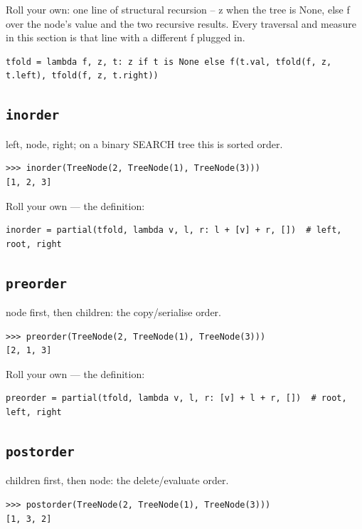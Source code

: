 \documentclass[10pt,letterpaper]{book}
\begin{document}
Roll your own: one line of structural recursion -- z when the tree is None, else f over the node's value and the two recursive results. Every traversal and measure in this section is that line with a different f plugged in.

\begin{lstlisting}[style=ex]
tfold = lambda f, z, t: z if t is None else f(t.val, tfold(f, z, t.left), tfold(f, z, t.right))
\end{lstlisting}

\subsection{\texttt{inorder}}\label{def:inorder}
left, node, right; on a binary SEARCH tree this is sorted order.
\begin{lstlisting}[style=ex]
>>> inorder(TreeNode(2, TreeNode(1), TreeNode(3)))
[1, 2, 3]
\end{lstlisting}

Roll your own --- the definition:

\begin{lstlisting}[style=ex]
inorder = partial(tfold, lambda v, l, r: l + [v] + r, [])  # left, root, right
\end{lstlisting}

\subsection{\texttt{preorder}}\label{def:preorder}
node first, then children: the copy/serialise order.
\begin{lstlisting}[style=ex]
>>> preorder(TreeNode(2, TreeNode(1), TreeNode(3)))
[2, 1, 3]
\end{lstlisting}

Roll your own --- the definition:

\begin{lstlisting}[style=ex]
preorder = partial(tfold, lambda v, l, r: [v] + l + r, [])  # root, left, right
\end{lstlisting}

\subsection{\texttt{postorder}}\label{def:postorder}
children first, then node: the delete/evaluate order.
\begin{lstlisting}[style=ex]
>>> postorder(TreeNode(2, TreeNode(1), TreeNode(3)))
[1, 3, 2]
\end{lstlisting}
\end{document}
